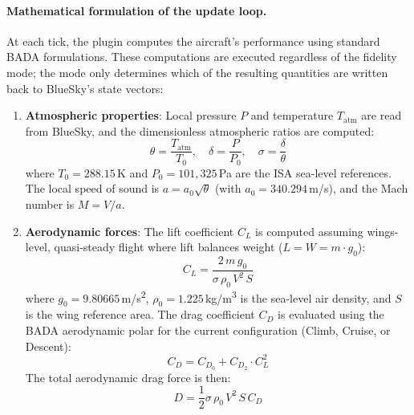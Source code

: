 \paragraph{Mathematical formulation of the update loop.}
At each tick, the plugin computes the aircraft's performance using standard BADA formulations. These computations are executed regardless of the fidelity mode; the mode only determines which of the resulting quantities are written back to BlueSky's state vectors:
\begin{enumerate}
    \item \textbf{Atmospheric properties}: Local pressure $P$ and temperature $T_{\text{atm}}$ are read from BlueSky, and the dimensionless atmospheric ratios are computed:
    \begin{equation}
        \theta = \frac{T_{\text{atm}}}{T_0}, \quad \delta = \frac{P}{P_0}, \quad \sigma = \frac{\delta}{\theta}
    \end{equation}
    where $T_0 = 288.15$\,K and $P_0 = 101{,}325$\,Pa are the ISA sea-level references. The local speed of sound is $a = a_0 \sqrt{\theta}$ (with $a_0 = 340.294$\,m/s), and the Mach number is $M = V / a$.
    
    \item \textbf{Aerodynamic forces}: The lift coefficient $C_L$ is computed assuming wings-level, quasi-steady flight where lift balances weight ($L = W = m \cdot g_0$):
    \begin{equation}
        C_L = \frac{2 \, m \, g_0}{\sigma \, \rho_0 \, V^2 \, S}
    \end{equation}
    where $g_0 = 9.80665$\,m/s\textsuperscript{2}, $\rho_0 = 1.225$\,kg/m\textsuperscript{3} is the sea-level air density, and $S$ is the wing reference area. The drag coefficient $C_D$ is evaluated using the BADA aerodynamic polar for the current configuration (Climb, Cruise, or Descent):
    \begin{equation}
        C_D = C_{D_0} + C_{D_2} \cdot C_L^2
    \end{equation}
    The total aerodynamic drag force is then:
    \begin{equation}
        D = \frac{1}{2} \sigma \, \rho_0 \, V^2 \, S \, C_D
    \end{equation}
    

\end{enumerate}

